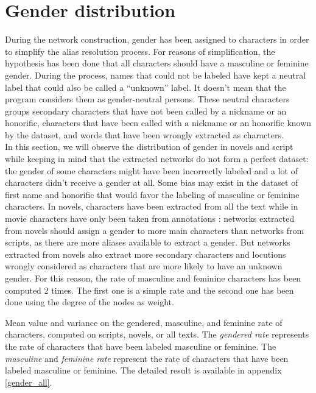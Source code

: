 \documentclass[a4paper, 12pt]{report}
\begin{document}
\section{Gender distribution}
During the network construction, gender has been assigned to characters in order to simplify the alias resolution process.
For reasons of simplification, the hypothesis has been done that all characters should have a masculine or feminine gender.
During the process, names that could not be labeled have kept a neutral label that could also be called a ``unknown'' label.
It doesn't mean that the program considers them as gender-neutral persons.
These neutral characters groups secondary characters that have not been called
by a nickname or an honorific, characters that have been called with a nickname or an honorific known by the dataset, and words that have been wrongly extracted as characters.\\

In this section, we will observe the distribution of gender in novels and script while keeping in mind that the extracted networks do not form a perfect dataset:
the gender of some characters might have been incorrectly labeled and a lot of characters didn't receive a gender at all.
Some bias may exist in the dataset of first name and honorific that would favor the labeling of masculine or feminine characters.
In novels, characters have been extracted from all the text while in movie characters have only been taken from annotations :
networks extracted from novels should assign a gender to more main characters than networks from scripts, as there are more aliases available to extract a gender.
But networks extracted from novels also extract more secondary characters and locutions wrongly considered as characters that are more likely to have an unknown gender.
For this reason, the rate of masculine and feminine characters has been computed 2 times.
The first one is a simple rate and the second one has been done using the degree of the nodes as weight.\\

\begin{table}[]
\caption{Mean value and variance on the gendered, masculine, and feminine rate of characters, computed on scripts, novels, or all texts. The \textit{gendered rate} represents the rate of characters that have been labeled masculine or feminine. The \textit{masculine} and \textit{feminine rate} represent the rate of characters that have been labeled masculine or feminine. The detailed result is available in appendix \ref{gender_all}.}
\label{gender_short}
\end{table}
\end{document}
